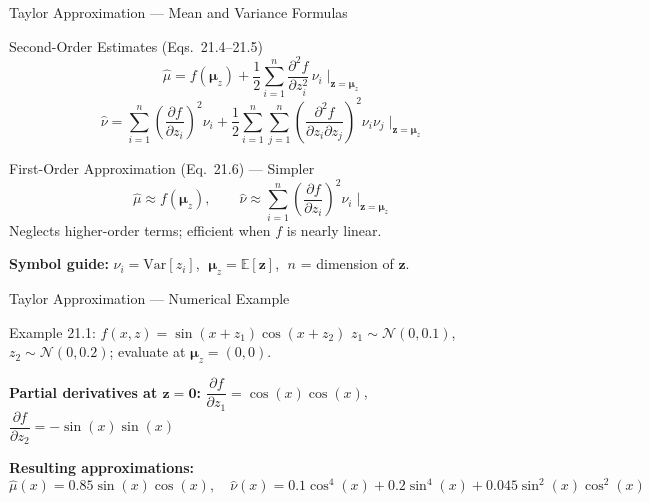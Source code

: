 \documentclass[aspectratio=169,10pt]{beamer}
\newcommand{\bz}{\mathbf{z}}
\newcommand{\bmu}{\boldsymbol{\mu}}
\newcommand{\E}{\mathbb{E}}
\newcommand{\Var}{\mathrm{Var}}
\newcommand{\hmu}{\hat{\mu}}
\newcommand{\hnu}{\hat{\nu}}
\begin{document}
\begin{frame}{Taylor Approximation --- Mean and Variance Formulas}
  \begin{block}{Second-Order Estimates (Eqs.\ 21.4--21.5)}
    \[
      \hmu = f(\bmu_z)
        + \frac{1}{2}\sum_{i=1}^{n}
          \frac{\partial^2 f}{\partial z_i^2}\,\nu_i
        \;\Bigg|_{\bz=\bmu_z}
    \]
    \[
      \hnu = \sum_{i=1}^{n}\left(\frac{\partial f}{\partial z_i}\right)^{\!2}\!\nu_i
           + \frac{1}{2}\sum_{i=1}^{n}\sum_{j=1}^{n}
             \left(\frac{\partial^2 f}{\partial z_i\partial z_j}\right)^{\!2}\!\nu_i\nu_j
        \;\Bigg|_{\bz=\bmu_z}
    \]
  \end{block}

  \begin{block}{First-Order Approximation (Eq.\ 21.6) --- Simpler}
    \[
      \hmu \approx f(\bmu_z),\qquad
      \hnu \approx \sum_{i=1}^{n}\left(\frac{\partial f}{\partial z_i}\right)^{\!2}\!\nu_i
        \;\Bigg|_{\bz=\bmu_z}
    \]
    Neglects higher-order terms; efficient when $f$ is nearly linear.
  \end{block}
  \textbf{Symbol guide:}
  $\nu_i = \Var[z_i]$, $\;\bmu_z = \E[\bz]$,
  $\;n$ = dimension of $\bz$.
\end{frame}

\begin{frame}{Taylor Approximation --- Numerical Example}
  \begin{block}{Example 21.1: $f(x,z)=\sin(x+z_1)\cos(x+z_2)$}
    $z_1\sim\mathcal{N}(0,0.1)$, $z_2\sim\mathcal{N}(0,0.2)$;
    evaluate at $\bmu_z=(0,0)$.
    \medskip

    \textbf{Partial derivatives at $\bz=\mathbf{0}$:}
    \quad$\dfrac{\partial f}{\partial z_1}=\cos(x)\cos(x)$,\quad
    $\dfrac{\partial f}{\partial z_2}=-\sin(x)\sin(x)$

    \medskip
    \textbf{Resulting approximations:}
    \[
      \hmu(x) = 0.85\sin(x)\cos(x),\quad
      \hnu(x) = 0.1\cos^4(x)+0.2\sin^4(x)+0.045\sin^2(x)\cos^2(x)
    \]
  \end{block}
\end{frame}
\end{document}
